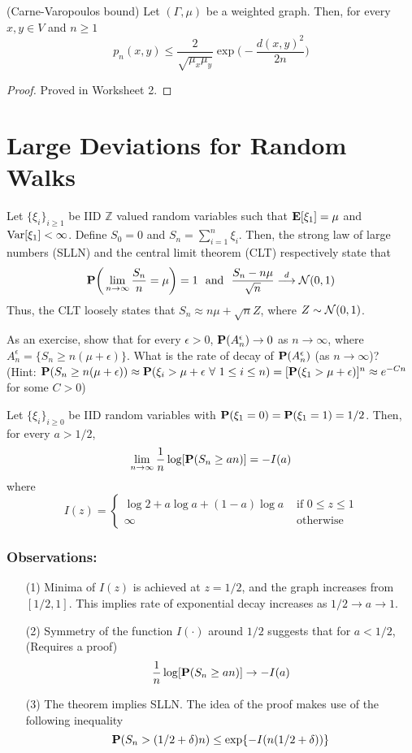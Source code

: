 \documentclass[main]{subfiles}
\begin{document}
\begin{theorem}
	(Carne-Varopoulos bound) Let $(\Gamma, \mu)$ be a weighted graph. Then, for every $x,y\in V$ and $n\ge 1$
	\[p_n(x,y)\le \frac{2}{\sqrt{\mu_x\mu_y}}\exp\bigg(-\frac{d(x,y)^2}{2n}\bigg)\]
\end{theorem}
\begin{proof}
	Proved in Worksheet 2.
\end{proof}

\section{Large Deviations for Random Walks}
Let $\{\xi_i\}_{i\ge 1}$ be IID $\mathbb{Z}$ valued random variables such that $\E[\xi_1]=\mu$ and $\Var[\xi_1]<\infty$. Define $S_0=0$ and $S_n=\sum_{i=1}^n\xi_i$. Then, the strong law of large numbers (SLLN) and the central limit theorem (CLT) respectively state that
\[\P\bigg(\lim_{n\to\infty}\frac{S_n}{n}=\mu\bigg)=1\text{\ \ and\ \ }\frac{S_n-n\mu}{\sqrt{n}}\overset{d}{\longrightarrow}\SN(0,1)\]
Thus, the CLT loosely states that $S_n \approx n\mu + \sqrt{n}Z$, where $Z\sim\SN(0,1)$.

As an exercise, show that for every $\epsilon > 0$, $\P(A_n^{\epsilon})\to 0$ as $n\to\infty$, where $A_n^{\epsilon}=\{S_n\ge n(\mu + \epsilon)\}$. What is the rate of decay of $\P(A_n^{\epsilon})$ (as $n\to\infty$)?\\
(Hint: $\P(S_n\ge n(\mu + \epsilon))\approx\P(\xi_i > \mu + \epsilon\text{ $\forall$ }1\le i\le n)=[\P(\xi_1 > \mu + \epsilon)]^n\approx e^{-Cn}$ for some $C>0$)

\begin{theorem}
	Let $\{\xi_i\}_{i\ge 0}$ be IID random variables with    $\P(\xi_1=0)=\P(\xi_1=1)=1/2$. Then, for every $a>1/2$,
	\[\lim_{n\to\infty}\frac{1}{n}\log[\P(S_n\ge an)]=-I(a)\]
	where
	\[I(z)=
		\begin{cases}
			\log 2 + a\log a + (1-a)\log a & \text{ if } 0\le z\le 1 \\
			\infty                         & \text{ otherwise}
		\end{cases}
	\]
\end{theorem}

\subsubsection*{Observations:}
\begin{itemize}
	\item[(1)] Minima of $I(z)$ is achieved at $z=1/2$, and the graph increases from $[1/2, 1]$. This implies rate of exponential decay increases as $1/2\to a\to 1$.
	\item[(2)] Symmetry of the function $I(\cdot)$ around $1/2$ suggests that for $a<1/2$, (Requires a proof)
		\[\frac{1}{n}\log[\P(S_n\ge an)]\to -I(a)\]
	\item[(3)] The theorem implies SLLN. The idea of the proof makes use of the following inequality
		\[\P(S_n>(1/2 + \delta)n)\le\exp\{-I(n(1/2+\delta))\}\]
\end{itemize}
\end{document}
